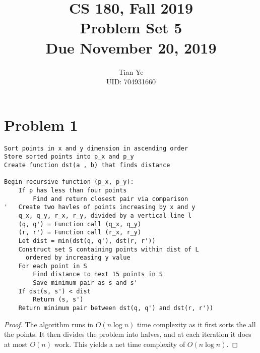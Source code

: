 \documentclass[11pt]{article}
\newcommand{\cnum}{CS 180}
\newcommand{\ced}{Fall 2019}
\newcommand{\ctitle}[3]{\title{\vspace{-0.5in}\cnum, \ced\\Problem Set #1 #2\\Due #3}}
\begin{document}
\ctitle{5}{}{November 20, 2019}
\author{Tian Ye \\ \small{UID: 704931660}}
\maketitle
\newpage

\section*{Problem 1}
\begin{lstlisting}
Sort points in x and y dimension in ascending order
Store sorted points into p_x and p_y
Create function dst(a , b) that finds distance

Begin recursive function (p_x, p_y):
	If p has less than four points
		Find and return closest pair via comparison
'	Create two havles of points increasing by x and y
	q_x, q_y, r_x, r_y, divided by a vertical line l
	(q, q') = Function call (q_x, q_y)
	(r, r') = Function call (r_x, r_y)
	Let dist = min(dst(q, q'), dst(r, r'))
	Construct set S containing points within dist of L
	  ordered by increasing y value
	For each point in S
		Find distance to next 15 points in S
		Save minimum pair as s and s'
	If dst(s, s') < dist
		Return (s, s')
	Return minimum pair between dst(q, q') and dst(r, r'))
\end{lstlisting}
\begin{proof}
The algorithm runs in $O(n\log n)$ time complexity as it first sorts the all the points. It then divides the problem into halves, and at each iteration it does at most $O(n)$ work. This yields a net time complexity of $O(n\log n)$.
\end{proof}
\newpage
\end{document}
